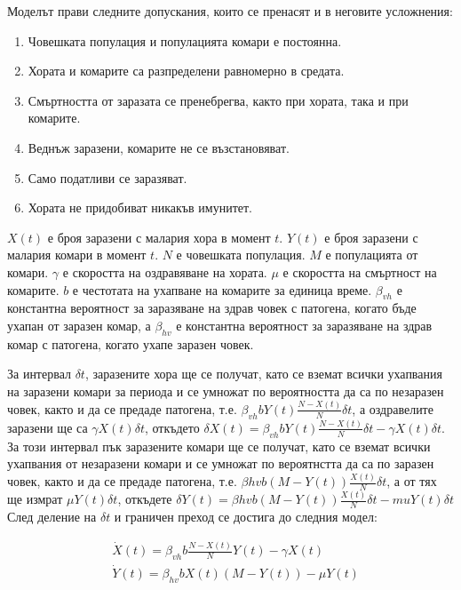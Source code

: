 Моделът прави следните допускания, които се пренасят и в неговите усложнения:
\begin{enumerate}
  \item Човешката популация и популацията комари е постоянна.
  \item Хората и комарите са разпределени равномерно в средата.
  \item Смъртността от заразата се пренебрегва, както при хората, така и при комарите.
  \item Веднъж заразени, комарите не се възстановяват.
  \item Само податливи се заразяват.
  \item Хората не придобиват никакъв имунитет.
\end{enumerate}

$X(t)$ е броя заразени с малария хора в момент $t$.
$Y(t)$ е броя заразени с малария комари в момент $t$.
$N$ е човешката популация.
$M$ е популацията от комари.
$\gamma$ е скоростта на оздравяване на хората.
$\mu$ е скоростта на смъртност на комарите.
$b$ е честотата на ухапване на комарите за единица време.
$\beta_{vh}$ е константна вероятност за заразяване на здрав човек с патогена, когато бъде ухапан от заразен комар, а $\beta_{hv}$ е константна вероятност за заразяване на здрав комар с патогена, когато ухапе заразен човек.

За интервал $\delta t$, заразените хора ще се получат, като се вземат всички ухапвания на заразени комари за периода и се умножат по вероятността да са по незаразен човек, както и да се предаде патогена, т.е. $\beta_{vh} b Y(t) \frac{N-X(t)}{N} \delta t$, а оздравелите заразени ще са $\gamma X(t) \delta t$, откъдето $\delta X(t) = \beta_{vh} b Y(t) \frac{N-X(t)}{N} \delta t - \gamma X(t) \delta t$.
За този интервал пък заразените комари ще се получат, като се вземат всички ухапвания от незаразени комари и се умножат по вероятнстта да са по заразен човек, както и да се предаде патогена, т.е. $\beta{hv} b (M - Y(t)) \frac{X(t)}{N} \delta t$, а от тях ще измрат $\mu Y(t) \delta t$, откъдете $\delta Y(t) = \beta{hv} b (M - Y(t)) \frac{X(t)}{N} \delta t - mu Y(t) \delta t$ След деление на $\delta t$ и граничен преход се достига до следния модел:

\begin{equation}
  \label{eq:BasicProblem}
  \begin{split}
    &\dot{X}(t) = \beta_{vh} b \frac{N-X(t)}{N} Y(t) - \gamma X(t) \\
    &\dot{Y}(t) = \beta_{hv} b X(t) (M-Y(t)) - \mu Y(t) \\
  \end{split}
\end{equation}

